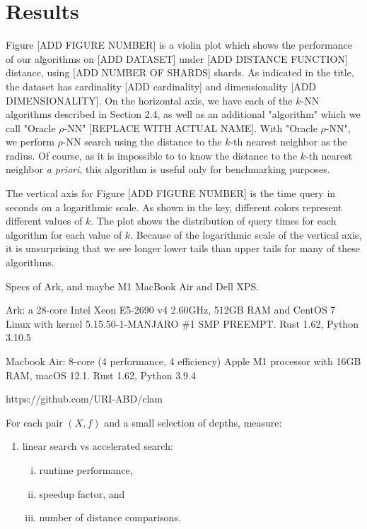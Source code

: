 \section{Results}
\label{sec:results}


Figure [ADD FIGURE NUMBER] is a violin plot which shows the performance of our algorithms
on [ADD DATASET] under [ADD DISTANCE FUNCTION] distance, using [ADD NUMBER OF SHARDS] shards.
As indicated in the title, the dataset has cardinality [ADD cardinality] and dimensionality [ADD DIMENSIONALITY].
On the horizontal axis, we have each of the $k$-NN algorithms described in Section 2.4, as well as  
an additional "algorithm" which we call "Oracle $\rho$-NN" [REPLACE WITH ACTUAL NAME].  With "Oracle $\rho$-NN", we perform $\rho$-NN search using the 
distance to the $k$-th nearest neighbor as the radius. Of course, as it is impossible to
to know the distance to the $k$-th nearest neighbor \emph{a priori}, this algorithm 
is useful only for benchmarking purposes.

The vertical axis for Figure [ADD FIGURE NUMBER] is the time query in seconds on a logarithmic scale. 
As shown in the key, different colors represent different values of $k$. 
The plot shows the distribution of query times for each algorithm for each value of $k$. 
Because of the logarithmic scale of the vertical axis, it is unsurprising that we 
see longer lower tails than upper tails for many of these algorithms. 

Specs of Ark, and maybe M1 MacBook Air and Dell XPS.

Ark: a 28-core Intel Xeon E5-2690 v4 2.60GHz, 512GB RAM and CentOS 7 Linux with kernel 5.15.50-1-MANJARO \#1 SMP PREEMPT. Rust 1.62, Python 3.10.5

Macbook Air: 8-core (4 performance, 4 efficiency) Apple M1 processor with 16GB RAM, macOS 12.1. Rust 1.62, Python 3.9.4

https://github.com/URI-ABD/clam

For each pair $(X, f)$ and a small selection of depths, measure:
\begin{enumerate}[1.]
    \item linear search vs accelerated search:
    \begin{enumerate}[i.]
        \item runtime performance,
        \item speedup factor, and
        \item number of distance comparisons.
    \end{enumerate}
\end{enumerate}


